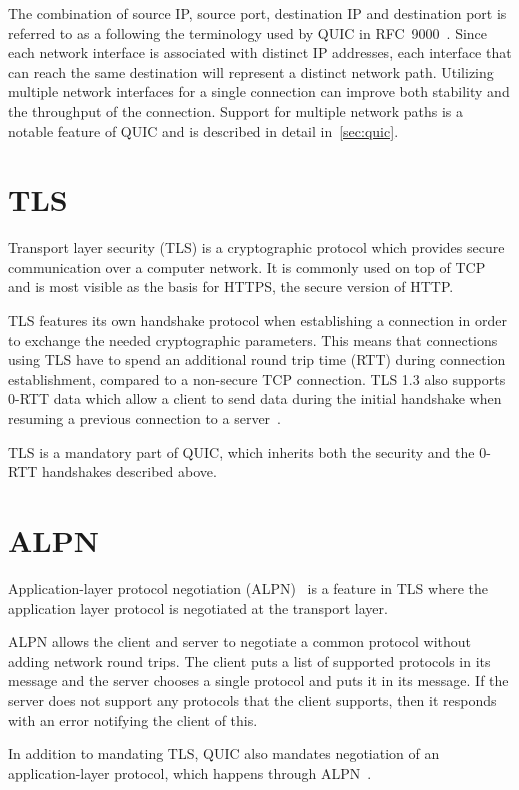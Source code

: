 The combination of source IP, source port, destination IP and destination port
is referred to as a  following the terminology used by QUIC in RFC~9000~\cite{rfc9000}.
Since each network interface is associated with distinct IP addresses,
each interface that can reach the same destination will represent a distinct network path.
Utilizing multiple network interfaces for a single connection can improve
both stability and the throughput of the connection.
Support for multiple network paths is a notable feature of QUIC
and is described in detail in~\cref{sec:quic}.


\section{TLS}
Transport layer security (TLS) is a cryptographic protocol which provides secure communication
over a computer network. It is commonly used on top of TCP and is
most visible as the basis for HTTPS, the secure version of HTTP.

TLS features its own handshake protocol when establishing a connection
in order to exchange the needed cryptographic parameters.
This means that connections using TLS have to spend an additional round trip time (RTT)
during connection establishment, compared to a non-secure TCP connection.
TLS 1.3 also supports 0-RTT data
which allow a client to send data during the initial handshake when resuming
a previous connection to a server~\cite{rfc8446}.

TLS is a mandatory part of QUIC, which inherits both the security
and the 0-RTT handshakes described above.

\section{ALPN}\label{sec:back-alpn}
Application-layer protocol negotiation (ALPN)~\cite{rfc7301} is a feature in TLS where the application layer
protocol is negotiated at the
transport layer.

ALPN allows the client and server to negotiate a common protocol
without adding network round trips. The client puts 
a list of supported protocols in its  message
and the server chooses a single protocol and puts it in
its  message. If the server does not support any
protocols that the client supports, then it responds with an
error notifying the client of this.

In addition to mandating TLS, QUIC also mandates negotiation
of an application-layer protocol, which happens through ALPN~\cite[sec. 7]{rfc9000}.

